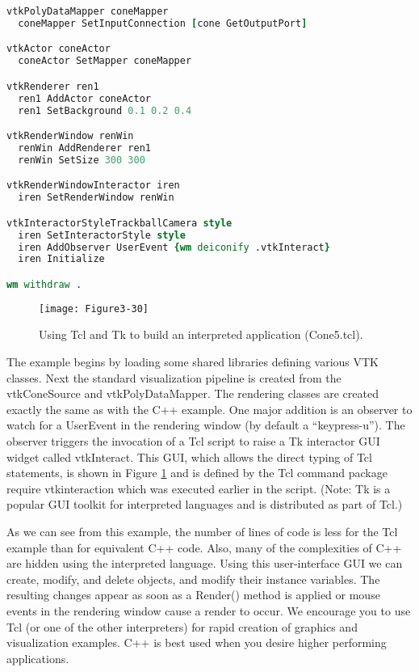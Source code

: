 \begin{description}[leftmargin=0cm,labelindent=0cm]
\begin{lstlisting}[language=TCL, caption={Cone5.tcl}]
vtkPolyDataMapper coneMapper
  coneMapper SetInputConnection [cone GetOutputPort]

vtkActor coneActor
  coneActor SetMapper coneMapper

vtkRenderer ren1
  ren1 AddActor coneActor
  ren1 SetBackground 0.1 0.2 0.4

vtkRenderWindow renWin
  renWin AddRenderer ren1
  renWin SetSize 300 300

vtkRenderWindowInteractor iren
  iren SetRenderWindow renWin

vtkInteractorStyleTrackballCamera style
  iren SetInteractorStyle style
  iren AddObserver UserEvent {wm deiconify .vtkInteract}
  iren Initialize

wm withdraw .
\end{lstlisting}

\begin{figure}[!htb]
  \centering
  \texttt{[image: Figure3-30]}\\
  \caption{Using Tcl and Tk to build an interpreted application (Cone5.tcl).}\label{fig:Figure3-30}
\end{figure}

The example begins by loading some shared libraries defining various VTK classes. Next the standard visualization pipeline is created from the vtkConeSource and vtkPolyDataMapper. The rendering classes are created exactly the same as with the C++ example. One major addition is an observer to watch for a UserEvent in the rendering window (by default a ``keypress-u''). The observer triggers the invocation of a Tcl script to raise a Tk interactor GUI widget called vtkInteract. This GUI, which allows the direct typing of Tcl statements, is shown in Figure \ref{fig:Figure3-30} and is defined by the Tcl command package require vtkinteraction which was executed earlier in the script. (Note: Tk is a popular GUI toolkit for interpreted languages and is distributed as part of Tcl.) 

As we can see from this example, the number of lines of code is less for the Tcl example than for equivalent C++ code. Also, many of the complexities of C++ are hidden using the interpreted language. Using this user-interface GUI we can create, modify, and delete objects, and modify their instance variables. The resulting changes appear as soon as a Render() method is applied or mouse events in the rendering window cause a render to occur. We encourage you to use Tcl (or one of the other interpreters) for rapid creation of graphics and visualization examples. C++ is best used when you desire higher performing applications.

\end{description}

